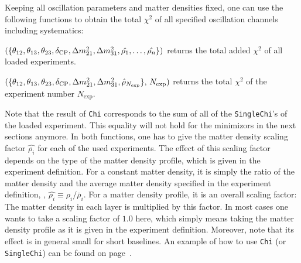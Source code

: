 Keeping all oscillation parameters and matter densities fixed, one can use the following functions to obtain the total $\chi^2$ of all specified oscillation channels including systematics:
\begin{function} 
$(\{ \theta_{12}, \theta_{13}, \theta_{23}, \delta_{\mathrm{CP}} , \Delta m_{21}^2 , \Delta m_{31}^2, \hat{\rho_1}, \hdots , \hat{\rho_n} \})$  returns the total added $\chi^2$ of all loaded experiments.
\end{function}
\begin{function}
 $(\{ \theta_{12}, \theta_{13}, \theta_{23}, \delta_{\mathrm{CP}} , \Delta m_{21}^2 , \Delta m_{31}^2, \hat{\rho}_{N_{\mathrm{exp}}} \}, \, N_{\mathrm{exp}} )$  returns the total $\chi^2$ of the experiment number $N_{\mathrm{exp}}$.
\end{function}
Note that the result of {\tt Chi} corresponds to the sum of all of the {\tt SingleChi}'s of the loaded experiment. This equality will not hold for the minimizors in the next sections anymore. In both functions, one has to give the matter density scaling factor $\hat{\rho_i}$ for each of the used experiments. The effect of this scaling factor depends on the type of the matter density profile, which is given in the  experiment definition. For a constant matter density, it is simply the ratio of the matter density and the average matter density specified in the experiment definition, \ie , $\hat{\rho_i} \equiv \rho_i/\bar{\rho}_i$. For a matter density profile, it is an overall scaling factor: The matter density in each layer is multiplied by this factor. In most cases one wants to take a scaling factor of $1.0$ here, which simply means taking the matter density profile as it is given in the experiment definition. Moreover, note that its effect is in general small for short baselines. An example of how to use  {\tt Chi} (or {\tt SingleChi}) can be found on page~\pageref{ex:corrth13dcp}.  

